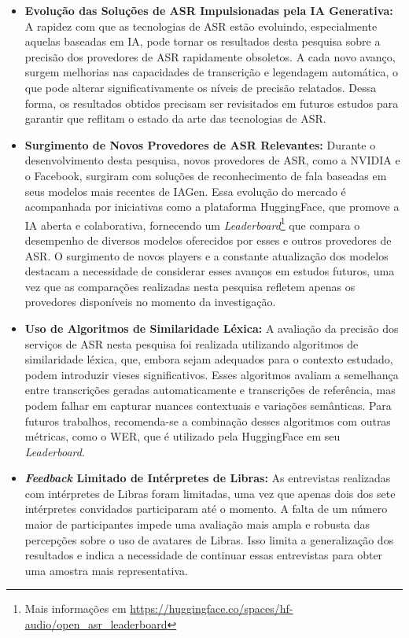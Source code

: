 \begin{itemize}

    \item \textbf{Evolução das Soluções de ASR Impulsionadas pela IA Generativa:} A rapidez com que as tecnologias de ASR estão evoluindo, especialmente aquelas baseadas em IA, pode tornar os resultados desta pesquisa sobre a precisão dos provedores de ASR rapidamente obsoletos. A cada novo avanço, surgem melhorias nas capacidades de transcrição e legendagem automática, o que pode alterar significativamente os níveis de precisão relatados. Dessa forma, os resultados obtidos precisam ser revisitados em futuros estudos para garantir que reflitam o estado da arte das tecnologias de ASR.

    \item \textbf{Surgimento de Novos Provedores de ASR Relevantes:} Durante o desenvolvimento desta pesquisa, novos provedores de ASR, como a NVIDIA e o Facebook, surgiram com soluções de reconhecimento de fala baseadas em seus modelos mais recentes de IAGen. Essa evolução do mercado é acompanhada por iniciativas como a plataforma HuggingFace, que promove a IA aberta e colaborativa, fornecendo um \textit{Leaderboard}\footnote{Mais informações em \url{https://huggingface.co/spaces/hf-audio/open_asr_leaderboard}} que compara o desempenho de diversos modelos oferecidos por esses e outros provedores de ASR. O surgimento de novos players e a constante atualização dos modelos destacam a necessidade de considerar esses avanços em estudos futuros, uma vez que as comparações realizadas nesta pesquisa refletem apenas os provedores disponíveis no momento da investigação.

    \item \textbf{Uso de Algoritmos de Similaridade Léxica:} A avaliação da precisão dos serviços de ASR nesta pesquisa foi realizada utilizando algoritmos de similaridade léxica, que, embora sejam adequados para o contexto estudado, podem introduzir vieses significativos. Esses algoritmos avaliam a semelhança entre transcrições geradas automaticamente e transcrições de referência, mas podem falhar em capturar nuances contextuais e variações semânticas. Para futuros trabalhos, recomenda-se a combinação desses algoritmos com outras métricas, como o WER, que é utilizado pela HuggingFace em seu \textit{Leaderboard}.

    \item \textbf{\textit{Feedback} Limitado de Intérpretes de Libras:} As entrevistas realizadas com intérpretes de Libras foram limitadas, uma vez que apenas dois dos sete intérpretes convidados participaram até o momento. A falta de um número maior de participantes impede uma avaliação mais ampla e robusta das percepções sobre o uso de avatares de Libras. Isso limita a generalização dos resultados e indica a necessidade de continuar essas entrevistas para obter uma amostra mais representativa.

\end{itemize}

